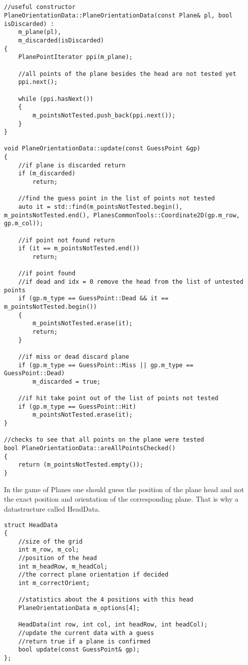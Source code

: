 \begin{lstlisting}


//useful constructor
PlaneOrientationData::PlaneOrientationData(const Plane& pl, bool isDiscarded) :
	m_plane(pl),
	m_discarded(isDiscarded)
{
	PlanePointIterator ppi(m_plane);
	
	//all points of the plane besides the head are not tested yet
	ppi.next();

	while (ppi.hasNext())
	{
		m_pointsNotTested.push_back(ppi.next());
	}
}

void PlaneOrientationData::update(const GuessPoint &gp)
{
	//if plane is discarded return
	if (m_discarded)
		return;
	
	//find the guess point in the list of points not tested
	auto it = std::find(m_pointsNotTested.begin(), m_pointsNotTested.end(), PlanesCommonTools::Coordinate2D(gp.m_row, gp.m_col));
	
	//if point not found return
	if (it == m_pointsNotTested.end())
		return;
	
	//if point found
	//if dead and idx = 0 remove the head from the list of untested points
	if (gp.m_type == GuessPoint::Dead && it == m_pointsNotTested.begin())
	{
		m_pointsNotTested.erase(it);
		return;
	}
	
	//if miss or dead discard plane
	if (gp.m_type == GuessPoint::Miss || gp.m_type == GuessPoint::Dead)
		m_discarded = true;
	
	//if hit take point out of the list of points not tested
	if (gp.m_type == GuessPoint::Hit)
		m_pointsNotTested.erase(it);
}

//checks to see that all points on the plane were tested
bool PlaneOrientationData::areAllPointsChecked()
{
	return (m_pointsNotTested.empty());
}

\end{lstlisting}

In the game of Planes one should guess the position of the plane head and not the exact position and orientation of the corresponding plane. That is why a datastructure called HeadData.

\begin{lstlisting}
struct HeadData
{
	//size of the grid
	int m_row, m_col;
	//position of the head
	int m_headRow, m_headCol;
	//the correct plane orientation if decided
	int m_correctOrient;
	
	//statistics about the 4 positions with this head
	PlaneOrientationData m_options[4];
	
	HeadData(int row, int col, int headRow, int headCol);
	//update the current data with a guess
	//return true if a plane is confirmed
	bool update(const GuessPoint& gp);
};
\end{lstlisting}

